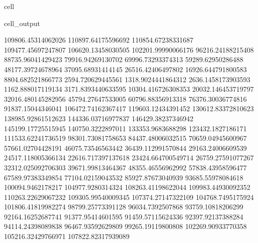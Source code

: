 \documentclass[letterpaper,10pt,english]{jupyterBook}
\begin{document}
\begin{sphinxuseclass}{cell}
\begin{sphinxVerbatimOutput}
\begin{sphinxuseclass}{cell_output}
\begin{sphinxVerbatim}[commandchars=\\\{\}]
109806.45314062026  110897.64175596692  110854.67238331687  109477.45697247807  106620.13458030505  102201.99990066176  96216.24188215408  88735.96041429423  79916.94269130702  69996.73293374313  59289.62950286488  48177.39724678964  37095.68931414145  26516.42406497802  16926.644791800583  8804.682521866773  2594.720629445561  \PYGZhy{}1318.9024441864312  \PYGZhy{}2636.1458173903593  \PYGZhy{}1162.888017119134  3171.8393440633595  10304.416726308353  20032.146453719797  32016.480145282956  45794.27647533005  60796.88356913318  76376.30036774816  91837.15044346041  106472.74162367417  119603.12434391452  130612.83372810623  138985.92861512623  144336.03716977837  146429.38237346942  145199.17725515945  140750.3222897011  133353.9683688298  123432.1827186171  111533.62241736519  98301.73081758653  84437.48006032515  70659.04945600967  57661.02704428191  46075.73546563442  36439.112991570844  29163.24006609539  24517.118005366134  22616.717397137618  23424.664700549714  26759.27591077267  32312.025092706303  39671.99813464367  48355.46556962992  57838.43958596477  67589.97383349854  77104.02159043532  85927.87673040939  93685.55978084618  100094.9462178217  104977.9280314324  108263.41198622044  109983.44930092352  110263.22629067232  109305.99540009345  107374.27147322109  104768.7495175924  101806.41819982274  98799.25773391128  96034.7392507868  93759.10818206299  92164.16252687741  91377.95414601595  91459.57115624336  92397.92137388284  94114.24398089838  96467.93592629809  99265.19119800808  102269.90933770358  105216.32429766971  107822.82317939089  

\end{sphinxVerbatim}
\end{sphinxuseclass}
\end{sphinxVerbatimOutput}
\end{sphinxuseclass}
\end{document}
